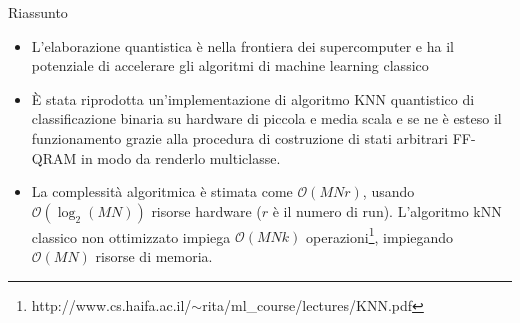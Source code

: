 \documentclass{beamer}
\begin{document}
    \begin{frame}{Riassunto}
        \begin{itemize}
            \item L'elaborazione quantistica è nella frontiera dei supercomputer e ha il potenziale di accelerare gli algoritmi di machine learning classico
            \item È stata riprodotta un'implementazione di algoritmo KNN quantistico di classificazione binaria su hardware di piccola e media scala e 
            se ne è esteso il funzionamento grazie alla procedura di costruzione di stati arbitrari FF-QRAM in modo da renderlo multiclasse. 
            \item La complessità algoritmica è stimata come $\mathcal{O}(MNr)$, usando $\mathcal{O}(\log_2(MN))$ risorse hardware ($r$ è il numero di run). 
            L'algoritmo kNN classico non ottimizzato impiega $\mathcal{O}(MNk)$ operazioni\footnote{http://www.cs.haifa.ac.il/$\sim$rita/ml\_course/lectures/KNN.pdf}, impiegando $\mathcal{O}(MN)$ risorse di memoria. 
        \end{itemize}
    \end{frame}
\end{document}
